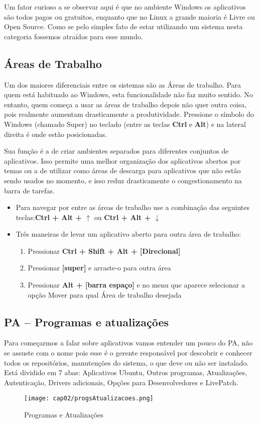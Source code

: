 Um fator curioso a se observar aqui é que no ambiente Windows os aplicativos são todos pagos ou gratuitos, enquanto que no Linux a grande maioria é Livre ou Open Source. Como se pelo simples fato de estar utilizando um sistema nesta categoria fossemos atraídos para esse mundo.

\subsection{Áreas de Trabalho}
Um dos maiores diferenciais entre os sistemas são as Áreas de trabalho. Para quem está habituado ao Windows, esta funcionalidade não faz muito sentido. No entanto, quem começa a usar as áreas de trabalho depois não quer outra coisa, pois realmente aumentam drasticamente a produtividade. Pressione o símbolo do Windows (chamado Super) no teclado (entre as teclas \textbf{Ctrl} e \textbf{Alt}) e na lateral direita é onde estão posicionadas.

Sua função é a de criar ambientes separados para diferentes conjuntos de aplicativos. Isso permite uma melhor organização dos aplicativos abertos por temas ou a de utilizar como áreas de descarga para aplicativos que não estão sendo usados no momento, e isso reduz drasticamente o congestionamento na barra de tarefas. \vspace{-1em}
\begin{itemize}
 \item Para navegar por entre as áreas de trabalho use a combinação das seguintes teclas:\textbf{Ctrl + Alt + $\uparrow$} ou \textbf{Ctrl + Alt + $\downarrow$}
 \item Três maneiras de levar um aplicativo aberto para outra área de trabalho:
 \begin{enumerate}
  \item Pressionar \textbf{Ctrl + Shift + Alt + [Direcional]}
  \item Pressionar \textbf{[super]} e arraste-o para outra área
  \item Pressionar \textbf{Alt + [barra espaço]} e no menu que aparece selecionar a opção Mover para qual Área de trabalho desejada
 \end{enumerate}
\end{itemize}

\subsection{PA – Programas e atualizações}
Para começarmos a falar sobre aplicativos vamos entender um pouco do PA, não se assuste com o nome pois esse é o gerente responsável por descobrir e conhecer todos os repositórios, manutenções do sistema, o que deve ou não ser instalado. \\[3mm]
Está dividido em 7 abas: Aplicativos Ubuntu, Outros programas, Atualizações, Autenticação, Drivers adicionais, Opções para Desenvolvedores e LivePatch.
\begin{figure}[H]
 \centering\texttt{[image: cap02/progsAtualizacoes.png]}
 \caption{Programas e Atualizações}
\end{figure}

